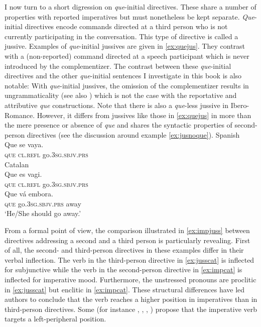 I now turn to a  short digression on \emph{que}-initial directives. These share a number of properties with reported imperatives but  must nonetheless be kept separate. \emph{Que}-initial directives encode commands directed at a  third person who is not currently participating in the conversation. This type of directive is called a jussive. Examples of  \emph{que}-initial jussives are given in \eqref{ex:quejus}. They contrast with a (non-reported) command directed at a speech participant which is never introduced by the complementizer. The contrast between these \emph{que}-initial directives and the other \emph{que}-initial sentences I investigate in this book is also notable: With \emph{que}-initial jussives,  the omission of the complementizer results in ungrammaticality (see also \cite[117]{Gras2016}) which is not the case with the reportative and attributive \emph{que} constructions. Note that there is also a \emph{que}-less jussive in Ibero-Romance. However, it differs from jussives like those in \eqref{ex:quejus} in more than the mere presence or absence of \emph{que} and shares the syntactic properties of second-person directives (see the discussion around example \eqref{ex:jusnoque}). 
	\ea\label{ex:quejus}
\ea\label{ex:quejusa}
 Spanish\\ 
\gll Que se vaya. \\
\textsc{que} \textsc{cl.refl} go.\textsc{3sg.sbjv.prs}\\	
\ex
Catalan\\ 
\gll Que es vagi. \\
\textsc{que} \textsc{cl.refl} go.\textsc{3sg.sbjv.prs}\\	
\ex\gll Que  vá embora.\\
\textsc{que}  go.\textsc{3sg.sbjv.prs} away\\
\glt`He/She should go away.' 
\z
\z



From a formal point of view, the comparison  illustrated in \eqref{ex:impjuss}  between  directives addressing  a second and a third person is particularly revealing. First of all, the second- and third-person directives in these examples differ in their verbal inflection.  The verb in the third-person directive in \eqref{ex:jusscat} is inflected for subjunctive while the verb in the second-person directive in \eqref{ex:impcat} is inflected for imperative mood.  Furthermore, the unstressed pronouns are proclitic in \eqref{ex:jusscat} but enclitic in \eqref{ex:impcat}. These structural differences have led  authors  to conclude that the  verb reaches a higher position in imperatives than in third-person directives.  Some (for instance  \citealt{Rivero1994}, \citealt{Rivero1995}, \citealt{DemonteSoriano2009}, \citealt{Alcazar2014}) propose that  the  imperative verb targets a left-peripheral position.

